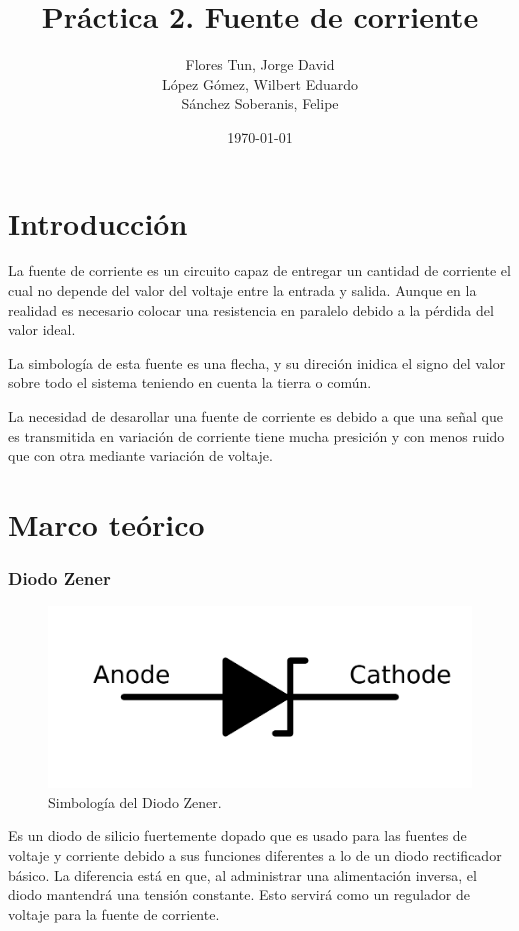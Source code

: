 \documentclass{article}
\title{Práctica 2. Fuente de corriente}
\author{Flores Tun, Jorge David\\ López Gómez, Wilbert Eduardo\\ Sánchez Soberanis, Felipe}
\date{\today}
\begin{document}
\maketitle

\tableofcontents

\section{Introducción}
La fuente de corriente es un circuito capaz de entregar un cantidad de corriente el cual no depende del valor del voltaje entre la entrada y salida. Aunque en la realidad es necesario colocar una resistencia en paralelo debido a la pérdida del valor ideal.

La simbología de esta fuente es una flecha, y su direción inidica el signo del valor sobre todo el sistema teniendo en cuenta la tierra o común.

La necesidad de desarollar una fuente de corriente es debido a que una señal que es transmitida en variación de corriente tiene mucha presición y con menos ruido que con otra mediante variación de voltaje.

\section{Marco teórico}
\subsubsection*{Diodo Zener}

\begin{figure}[h]
    \centering
    \includegraphics[scale=0.2]{1024px-Zener_diode_symbol.svg.png}    
    \caption{Simbología del Diodo Zener.}
    \label{Fig: Simbologia del Diodo Zener}
\end{figure}


Es un diodo de silicio fuertemente dopado que es usado para las fuentes de voltaje y corriente debido a sus funciones 
diferentes a lo de un diodo rectificador básico. La diferencia está en que, al administrar una alimentación inversa, 
el diodo mantendrá una tensión constante. Esto servirá como un regulador de voltaje para la fuente de corriente.
\end{document}
